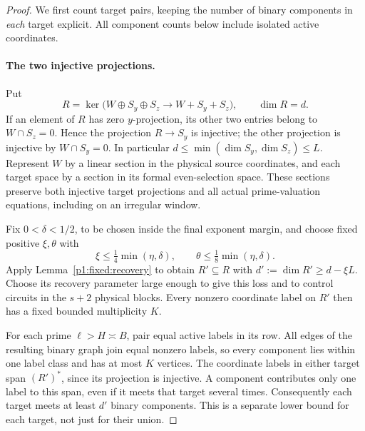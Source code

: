 \begin{proof}
We first count target pairs, keeping the number of binary components in
\emph{each} target explicit. All component counts below include isolated
active coordinates.

\paragraph{The two injective projections.}
Put
\[
 R=\ker\bigl(W\oplus S_y\oplus S_z\longrightarrow W+S_y+S_z\bigr),
 \qquad \dim R=d.
\]
If an element of $R$ has zero $y$-projection, its other two entries
belong to $W\cap S_z=0$. Hence the projection $R\to S_y$ is
injective; the other projection is injective by $W\cap S_y=0$.
In particular $d\leq\min(\dim S_y,\dim S_z)\leq L$.
Represent $W$ by a linear section in the physical source coordinates,
and each target space by a section in its formal even-selection space.
These sections preserve both injective target projections and all actual
prime-valuation equations, including on an irregular window.

Fix $0<\delta<1/2$, to be chosen inside the final exponent margin,
and choose fixed positive $\xi,\theta$ with
\[
 \xi\leq\tfrac14\min(\eta,\delta),\qquad
 \theta\leq\tfrac18\min(\eta,\delta).
\]
Apply Lemma~\ref{p1:fixed:recovery} to obtain $R'\subseteq R$ with
$d':=\dim R'\geq d-\xi L$. Choose its recovery parameter large
enough to give this loss and to control circuits in the $s+2$ physical
blocks. Every nonzero coordinate label on $R'$ then has a fixed
bounded multiplicity $K$.

For each prime $\ell>H\asymp B$, pair equal active labels in its
row. All edges of the resulting binary graph join equal nonzero
labels, so every component lies within one label class and has at
most $K$ vertices. The coordinate labels in either target span
$(R')^*$, since its projection is injective. A component contributes
only one label to this span, even if it meets that target several times.
Consequently each target meets at least $d'$ binary components.
This is a separate lower bound for each target, not just for their union.


\end{proof}
